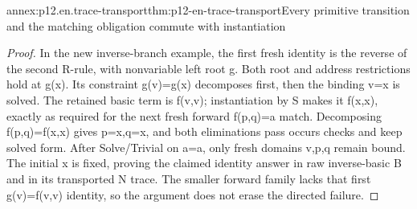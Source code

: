 \begin{annexitem}{annex:p12.en.trace-transport}{thm:p12-en-trace-transport}{Every primitive transition and the matching obligation commute with instantiation}
\begin{proof}
In the new inverse-branch example, the first fresh identity is
the reverse of the second R-rule, with nonvariable left root g.
Both root and address restrictions hold at g(x). Its constraint
g(v)=g(x) decomposes first, then the binding v=x is solved.
The retained basic term is f(v,v); instantiation by S makes
it f(x,x), exactly as required for the next fresh forward
f(p,q)=a match. Decomposing f(p,q)=f(x,x) gives p=x,q=x,
and both eliminations pass occurs checks and keep solved form.
After Solve/Trivial on a=a, only fresh domains v,p,q remain
bound. The initial x is fixed, proving the claimed identity
answer in raw inverse-basic B and in its transported N trace.
The smaller forward family lacks that first g(v)=f(v,v)
identity, so the argument does not erase the directed failure.
\end{proof}
\end{annexitem}

